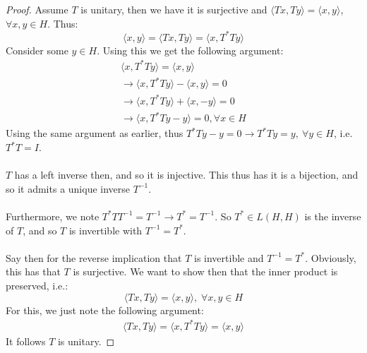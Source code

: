 \documentclass[12pt]{article}
\newenvironment{ex}[2][Exercise]{\begin{trivlist}
\item[\hskip \labelsep {\bfseries #1}\hskip \labelsep {\bfseries #2.}]}{\end{trivlist}}
\begin{document}
\begin{ex}{8}
\begin{enumerate}[label=(\alph*)]
        \begin{proof}
            Assume $T$ is unitary, then we have it is surjective and $\langle Tx, Ty \rangle = \langle x, y \rangle$, $\forall x, y \in H$.  Thus:
            $$\langle x, y \rangle = \langle Tx, Ty \rangle = \langle x, T^*Ty \rangle$$
            Consider some $y \in H$. Using this we get the following argument:
            \begin{equation}
                \begin{aligned}
                    \langle x, T^*Ty \rangle = \langle x, y \rangle \\
                    \rightarrow \langle x, T^*Ty \rangle - \langle x, y \rangle = 0 \\
                    \rightarrow \langle x, T^*Ty \rangle + \langle x, -y \rangle = 0 \\
                    \rightarrow \langle x, T^*Ty - y \rangle = 0, \forall x \in H
                \end{aligned}
            \end{equation}
            Using the same argument as earlier, thus $T^*Ty - y = 0 \rightarrow T^*Ty = y, \: \forall y \in H$, i.e. $T^*T = I$. \\ \\ $T$ has a left inverse then, and so it is injective. This thus has it is a bijection, and so it admits a unique inverse $T^{-1}$. \\ \\
            Furthermore, we note $T^*TT^{-1} = T^{-1} \rightarrow T^* = T^{-1}$. So $T^* \in L(H,H)$ is the inverse of $T$, and so $T$ is invertible with $T^{-1} = T^*$.
            \\ \\
            Say then for the reverse implication that $T$ is invertible and $T^{-1} = T^*$. Obviously, this has that $T$ is surjective. We want to show then that the inner product is preserved, i.e.:
            \begin{equation}
                \langle Tx, Ty \rangle = \langle x, y \rangle, \; \forall x, y \in H
            \end{equation}
            For this, we just note the following argument:
            \begin{equation}
                \begin{aligned}
                    \langle Tx, Ty \rangle = \langle x, T^*Ty \rangle = \langle x, y \rangle
                \end{aligned}
            \end{equation}
            It follows $T$ is unitary.
        \end{proof}
    \end{enumerate}
\end{ex}
\end{document}
